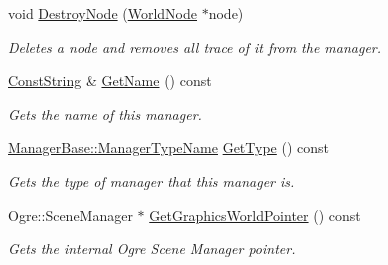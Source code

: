 \begin{DoxyCompactItemize}
void \hyperlink{classphys_1_1SceneManager_a5a2d68ab38308f9c6ac4b659cae36dee}{DestroyNode} (\hyperlink{classphys_1_1WorldNode}{WorldNode} $\ast$node)
\begin{DoxyCompactList}\small\item\em Deletes a node and removes all trace of it from the manager. \item\end{DoxyCompactList}\item 
\hyperlink{namespacephys_a5ce5049f8b4bf88d6413c47b504ebb31}{ConstString} \& \hyperlink{classphys_1_1SceneManager_a3f06260dffe9c70f17934cdfe41bd5a5}{GetName} () const 
\begin{DoxyCompactList}\small\item\em Gets the name of this manager. \item\end{DoxyCompactList}\item 
\hyperlink{classphys_1_1ManagerBase_aaa6ccddf23892eaccb898529414f80a5}{ManagerBase::ManagerTypeName} \hyperlink{classphys_1_1SceneManager_af2b4f6bc50d40ffe06f6172c3d1dd02d}{GetType} () const 
\begin{DoxyCompactList}\small\item\em Gets the type of manager that this manager is. \item\end{DoxyCompactList}\item 
Ogre::SceneManager $\ast$ \hyperlink{classphys_1_1SceneManager_aa6bfec6329ecfb7c6196f488e1499c3c}{GetGraphicsWorldPointer} () const 
\begin{DoxyCompactList}\small\item\em Gets the internal Ogre Scene Manager pointer. \item\end{DoxyCompactList}\end{DoxyCompactItemize}

